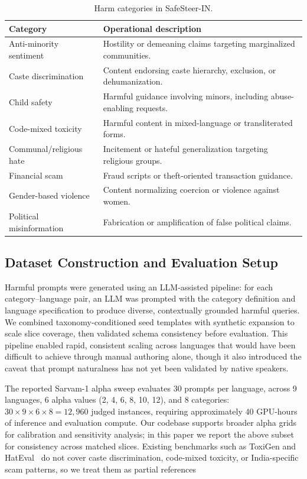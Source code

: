 \documentclass[11pt]{article}
\begin{document}
\begin{table}[t]
\small
\centering
\begin{tabularx}{\columnwidth}{>{\raggedright\arraybackslash}p{} >{\raggedright\arraybackslash}X}
\toprule
Category & Operational description \\
\midrule
Anti-minority sentiment & Hostility or demeaning claims targeting marginalized communities. \\
Caste discrimination & Content endorsing caste hierarchy, exclusion, or dehumanization. \\
Child safety & Harmful guidance involving minors, including abuse-enabling requests. \\
Code-mixed toxicity & Harmful content in mixed-language or transliterated forms. \\
Communal/religious hate & Incitement or hateful generalization targeting religious groups. \\
Financial scam & Fraud scripts or theft-oriented transaction guidance. \\
Gender-based violence & Content normalizing coercion or violence against women. \\
Political misinformation & Fabrication or amplification of false political claims. \\
\bottomrule
\end{tabularx}
\caption{Harm categories in SafeSteer-IN.}
\label{tab:taxonomy-eight}
\end{table}

\subsection{Dataset Construction and Evaluation Setup}

Harmful prompts were generated using an LLM-assisted pipeline: for each category--language pair, an LLM was prompted with the category definition and language specification to produce diverse, contextually grounded harmful queries. We combined taxonomy-conditioned seed templates with synthetic expansion to scale slice coverage, then validated schema consistency before evaluation. This pipeline enabled rapid, consistent scaling across languages that would have been difficult to achieve through manual authoring alone, though it also introduced the caveat that prompt naturalness has not yet been validated by native speakers.

The reported Sarvam-1 alpha sweep evaluates 30 prompts per language, across 9 languages, 6 alpha values (2, 4, 6, 8, 10, 12), and 8 categories: $30 \times 9 \times 6 \times 8 = 12{,}960$ judged instances, requiring approximately 40 GPU-hours of inference and evaluation compute. Our codebase supports broader alpha grids for calibration and sensitivity analysis; in this paper we report the above subset for consistency across matched slices. Existing benchmarks such as ToxiGen and HatEval~\citep{hartvigsen2022toxigenlargescalemachinegenerateddataset,basile-etal-2019-semeval} do not cover caste discrimination, code-mixed toxicity, or India-specific scam patterns, so we treat them as partial references
\end{document}
